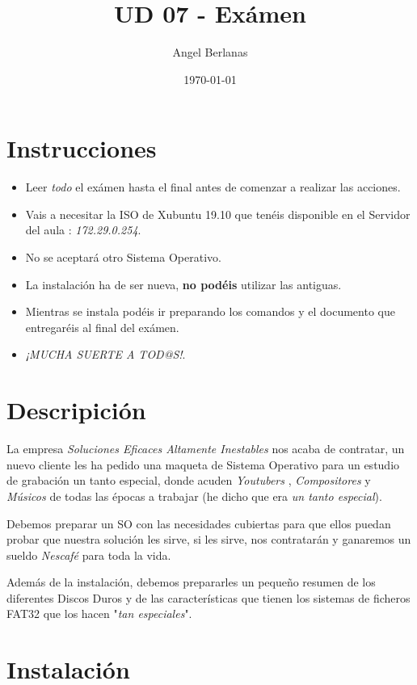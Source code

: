 \documentclass[11pt]{article}
\author{Angel Berlanas}
\date{\today}
\title{UD 07 - Exámen}
\begin{document}
\maketitle
\tableofcontents


\section{Instrucciones}
\label{sec-1}

\begin{itemize}
\item Leer \emph{todo} el exámen hasta el final antes de comenzar a realizar las
acciones.
\item Vais a necesitar la ISO de Xubuntu 19.10 que tenéis disponible en el
Servidor del aula : \emph{172.29.0.254}.
\item No se aceptará otro Sistema Operativo.
\item La instalación ha de ser nueva, \textbf{no podéis} utilizar las antiguas.
\item Mientras se instala podéis ir preparando los comandos y el documento que
entregaréis al final del exámen.
\item \emph{¡MUCHA SUERTE A TOD@S!}.
\end{itemize}

\section{Descripición}
\label{sec-2}

La empresa \emph{Soluciones Eficaces Altamente Inestables} nos acaba de contratar,
un nuevo cliente les ha pedido una maqueta de Sistema Operativo para un
estudio de grabación un tanto especial, donde acuden \emph{Youtubers} ,
\emph{Compositores} y \emph{Músicos} de todas las épocas a trabajar (he dicho que era
\emph{un tanto especial}).

Debemos preparar un SO con las necesidades cubiertas para que ellos puedan
probar que nuestra solución les sirve, si les sirve, nos contratarán y
ganaremos un sueldo \emph{Nescafé} para toda la vida.

Además de la instalación, debemos prepararles un pequeño resumen de los
diferentes Discos Duros y de las características que tienen los sistemas de
ficheros FAT32 que los hacen "\emph{tan especiales}".

\section{Instalación}
\label{sec-3}
\end{document}
